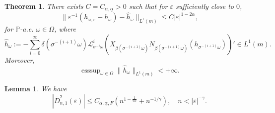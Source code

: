 \documentclass[10pt,a4paper]{amsart}
\newtheorem{theorem}{Theorem}
\newtheorem{lemma}{Lemma}
\DeclareMathOperator{\esssup}{esssup}
\begin{document}
	\begin{theorem}\label{sharpl}
		There exists $C=C_{\alpha, \underline{\alpha}}>0$ such that for $\varepsilon$ sufficiently close to $0$,
		\begin{equation}\label{stronger}
			\|\varepsilon^{-1}(h_{\omega, \varepsilon}-h_\omega)-\hat h_\omega \|_{L^1(m)}\le C|\varepsilon|^{1-2\alpha},
		\end{equation}
		for $\mathbb P$-a.e. $\omega \in \Omega$,
		where
		\begin{equation}\label{series}
			\hat h_\omega:=-\sum_{i=0}^\infty \delta (\sigma^{-(i+1)}\omega) \mathcal L_{\sigma^{-i}\omega}^i \left(X_{\beta(\sigma^{-(i+1)}\omega)} N_{\beta(\sigma^{-(i+1)}\omega)} (h_{\sigma^{-(i+1)}\omega}) \right)' \in L^1(m).
		\end{equation}
		Moreover, 
		\begin{equation}\label{series2}
			\esssup_{\omega \in \Omega}\|\hat h_\omega \|_{L^1(m)}<+\infty.
		\end{equation}
	\end{theorem}

\begin{lemma}\label{lem:aux2}
	We have
	\[
	|\bar D_{n, 1}^2(\varepsilon)| \le C_{\alpha, \underline{\alpha}, F}( 
	n^{1-\frac{1}{2\alpha}}
	+n^{-1/\gamma}), \quad n<|\varepsilon|^{-\gamma}.
	\]
\end{lemma}
\end{document}
